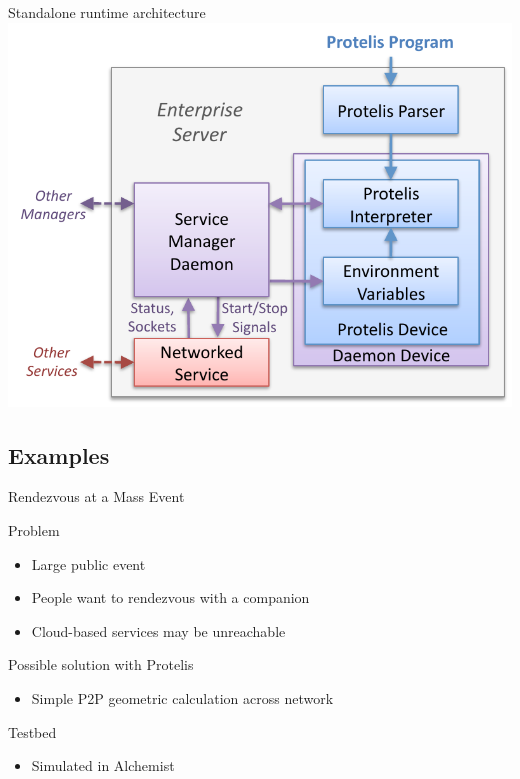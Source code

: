 \documentclass[presentation]{beamer} %
\begin{document}
\begin{frame}{Standalone runtime architecture}
  \centering
  \includegraphics[width=0.8\textwidth{}]{imgs/embedded}
\end{frame}

\subsection{Examples}

\begin{frame}{Rendezvous at a Mass Event}
  \begin{block} {Problem}
   \begin{itemize}
    \item Large public event
    \item People want to rendezvous with a companion
    \item Cloud-based services may be unreachable
   \end{itemize}
  \end{block}
  \begin{block} {Possible solution with Protelis}
   \begin{itemize}
    \item Simple P2P geometric calculation across network
   \end{itemize}
  \end{block}
  \begin{block} {Testbed}
   \begin{itemize}
    \item Simulated in Alchemist
   \end{itemize}
  \end{block}
\end{frame}
\end{document}
